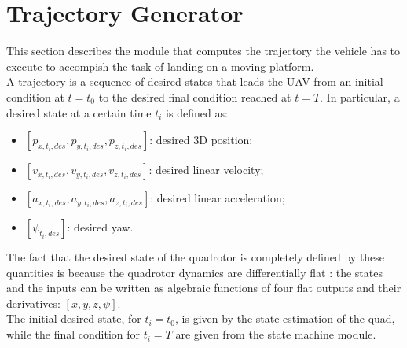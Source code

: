 \chapter{Trajectory Generator}\label{chap:trajectory_generator}
This section describes the module that computes the trajectory the vehicle has to execute to accompish the task of landing on a moving platform.\\

A trajectory is a sequence of desired states that leads the UAV from an initial condition at $t = t_0 $ to the desired final condition reached at $t = T$. In particular, a desired state at a certain time $t_i$ is defined as:
 \begin{itemize}
\item $[p_{x,t_i,des},p_{y,t_i,des},p_{z,t_i,des}]$: desired 3D position;
\item $[v_{x,t_i,des},v_{y,t_i,des},v_{z,t_i,des}]$: desired linear velocity;
\item $[a_{x,t_i,des},a_{y,t_i,des},a_{z,t_i,des}]$: desired linear acceleration;
\item $[\psi_{t_i,des}]$: desired yaw.
\end{itemize}
The fact that the desired state of the quadrotor is completely defined by these quantities is because the quadrotor dynamics are differentially flat \cite{van1997real}: the states and the inputs can be written as algebraic functions of four flat outputs and their derivatives: $[x,y,z,\psi]$.\\

The initial desired state, for $t_i = t_0$, is given by the state estimation of the quad, while the final condition for $t_i = T$ are given from the state machine module. \\

